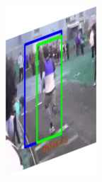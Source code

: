 \documentclass{report}
\begin{document}
\begin{figure}[h]
  \centering
  \begin{subfigure}{0.15\textwidth}
    \includegraphics[width=\textwidth]{output/img_0.jpg}
  \end{subfigure}
  \begin{subfigure}{0.15\textwidth}

\end{subfigure}
\end{figure}
\end{document}
